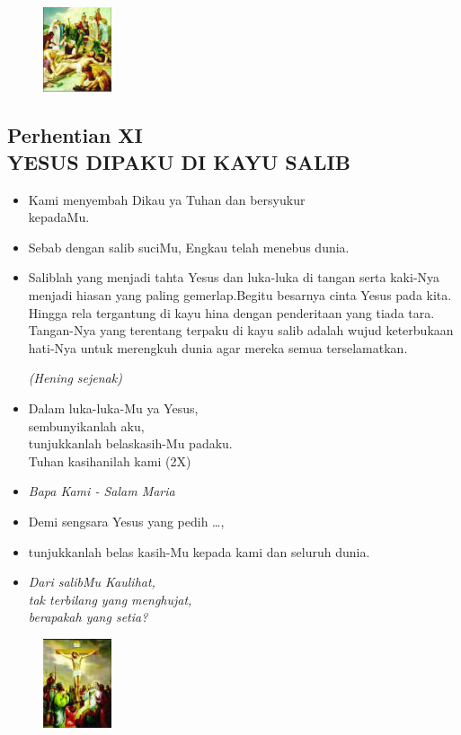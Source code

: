 \documentclass[a5paper,headsepline,titlepage,11pt,nnormalheadings,DIVcalc]{scrbook}
\newcommand{\BU}[1]{\begin{itemize} \item[U:] #1 \end{itemize}}
\newcommand{\BP}[1]{\begin{itemize} \item[P:] #1 \end{itemize}}
\newcommand{\kamiMenyembah}{\BP{ Kami menyembah Dikau ya Tuhan dan bersyukur\\kepadaMu.}
\BU{ Sebab dengan salib suciMu, Engkau telah menebus dunia.}
}
\newcommand{\kasihanilahKami}{\BP{Demi sengsara Yesus yang pedih \ldots,}
\BU{tunjukkanlah belas kasih-Mu kepada kami dan seluruh dunia.}}
\def\hening{\par \textit{(Hening sejenak)}}
\begin{document}
\begin{figure}
\includegraphics[width=2cm]{jalansalib_files/11_small.jpg}
\end{figure}
\subsection*{Perhentian XI\\
YESUS DIPAKU DI KAYU SALIB}

\kamiMenyembah

\BP{Saliblah yang menjadi tahta Yesus dan luka-luka di tangan serta kaki-Nya menjadi hiasan yang paling gemerlap.Begitu besarnya cinta Yesus pada kita. Hingga rela tergantung di kayu hina dengan penderitaan yang tiada tara. Tangan-Nya yang terentang terpaku di kayu salib adalah wujud keterbukaan hati-Nya untuk merengkuh dunia agar mereka semua terselamatkan.
\hening
}

\BU{Dalam luka-luka-Mu ya Yesus,\\ sembunyikanlah aku,\\ tunjukkanlah belaskasih-Mu padaku.\\
Tuhan kasihanilah kami (2X)
}

\large\begin{itemize}\item[~]\it{Bapa Kami - Salam Maria}\end{itemize}\normalsize
\kasihanilahKami

\begin{itemize}
\item[12.] \it{Dari salibMu Kaulihat,\\
	tak terbilang yang menghujat,\\
	berapakah yang setia?}
\end{itemize}


\begin{figure}
\includegraphics[width=2cm]{jalansalib_files/12_small.jpg}
\end{figure}
\end{document}

